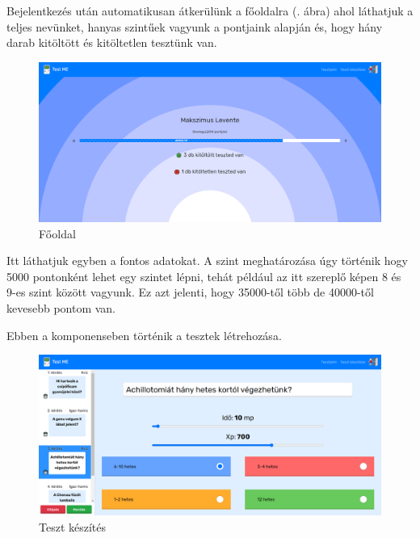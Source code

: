 
Bejelentkezés után automatikusan átkerülünk a főoldalra (. ábra) ahol láthatjuk a teljes nevünket, hanyas szintűek vagyunk a pontjaink alapján és, hogy hány darab kitöltött és kitöltetlen tesztünk van.

\begin{figure}[h!]
	\centering
	\includegraphics[width=\linewidth]{images/home.png}
	\caption{Főoldal}
	\label{fig:home}
\end{figure}

\noindent Itt láthatjuk egyben a fontos adatokat. A szint meghatározása úgy történik hogy 5000 pontonként lehet egy szintet lépni, tehát például az itt szereplő képen 8 és 9-es szint között vagyunk. Ez azt jelenti, hogy 35000-től több de 40000-től kevesebb pontom van.


Ebben a komponenseben történik a tesztek létrehozása.

\begin{figure}[H]
    \centering
    \includegraphics[width=\linewidth]{images/make_test1.png}
    \caption{Teszt készítés}
    \label{fig:make_test1}
\end{figure}

